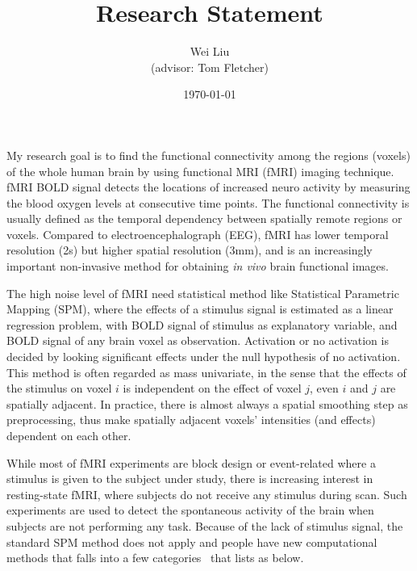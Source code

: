 \documentclass[12pt]{article}
\begin{document}
\title{Research Statement}
\author{Wei Liu\\ \small{(advisor: Tom Fletcher)} }
\date{\today}
\maketitle

My research goal is to find the functional connectivity among the regions (voxels) of the whole human brain by using functional MRI (fMRI) imaging technique. fMRI BOLD signal detects the locations of increased neuro activity by measuring the blood oxygen levels at consecutive time points. The functional connectivity is usually defined as the temporal dependency between spatially remote regions or voxels. Compared to electroencephalograph (EEG), fMRI has lower temporal resolution (2s) but higher spatial resolution (3mm), and is an increasingly important non-invasive method for obtaining \emph{in vivo} brain functional images. 

The high noise level of fMRI need statistical method like Statistical Parametric Mapping (SPM), where the effects of a stimulus signal is estimated as a linear regression problem, with BOLD signal of stimulus as explanatory variable, and BOLD signal of any brain voxel as observation. Activation or no activation  is decided by looking significant effects under the null hypothesis of no activation. This method is often regarded as mass univariate, in the sense that the effects of the stimulus on voxel $i$ is independent on the effect of voxel $j$, even $i$ and $j$ are spatially adjacent. In practice, there is almost always a spatial smoothing step as preprocessing, thus make spatially adjacent voxels' intensities (and effects) dependent on each other.


While most of fMRI experiments are block design or event-related where a stimulus is given to the subject under study, there is increasing interest in resting-state fMRI, where subjects do not receive any stimulus during scan. Such experiments are used to detect the spontaneous activity of the brain when subjects are not performing any task. Because of the lack of stimulus signal, the standard SPM method does not apply and people have new computational methods that falls into a few categories~\cite{margulies2010resting} that lists as below.
\end{document}
